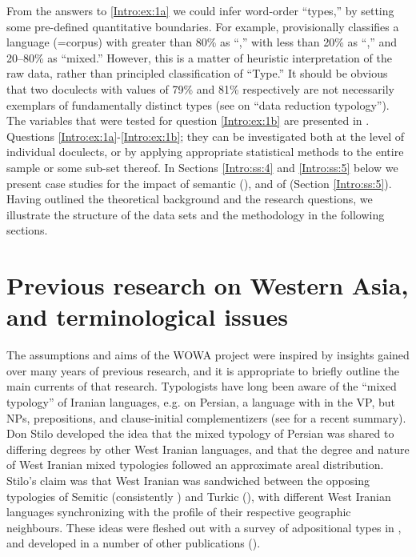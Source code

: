 \documentclass[output=paper,colorlinks,citecolor=brown,collectionchapter]{langscibook}
\begin{document}
From the answers to \ref{Intro:ex:1a} we could infer word-order ``types,'' by setting some pre-defined quantitative boundaries. For example, \citet[559]{levshina_token-based_2019} provisionally classifies a language (=corpus) with greater than 80\%  as ``,'' with less than 20\%  as ``,'' and 20--80\% as ``mixed.'' However, this is a matter of heuristic interpretation of the raw data, rather than principled classification of ``Type.'' It should be obvious that two doculects with values of 79\% and 81\%  respectively are not necessarily exemplars of fundamentally distinct types (see \citealt{walchli_data_2009} on ``data reduction typology''). The variables that were tested for question \ref{Intro:ex:1b} are presented in . Questions \ref{Intro:ex:1a}-\ref{Intro:ex:1b}; they can be investigated both at the level of individual doculects, or by applying appropriate statistical methods to the entire sample or some sub-set thereof. In Sections \ref{Intro:ss:4} and  \ref{Intro:ss:5} below we present case studies for the impact of semantic  (), and of  (Section  \ref{Intro:ss:5}). Having outlined the theoretical background and the research questions, we illustrate the structure of the data sets and the methodology in the following sections.

\section{Previous research on Western Asia, and terminological issues}\label{Intro:ss:2}

\begin{sloppypar}
The assumptions and aims of the WOWA project were inspired by insights gained over many years of previous research, and it is appropriate to briefly outline the main currents of that research. Typologists have long been aware of the ``mixed typology'' of Iranian languages, e.g. \citet[19]{comrie_language_1989} on Persian, a language with  in the VP, but  NPs, prepositions, and clause-initial complementizers (see \citealt{dabir-moghaddam_typological_2018} for a recent summary). Don Stilo developed the idea that the mixed typology of Persian was shared to differing degrees by other West Iranian languages, and that the degree and nature of West Iranian mixed typologies followed an approximate areal distribution. Stilo's claim was that West Iranian was sandwiched between the opposing typologies of Semitic (consistently ) and Turkic (), with different West Iranian languages synchronizing with the profile of their respective geographic neighbours. These ideas were fleshed out with a survey of adpositional types in \citet{Stilo2005IranianBuffer,stilo2006circumpositions,stilo_circumpositions_2009}, and developed in a number of other publications (\citeyear{stilo_intersection_2012,stilo_preverbal_2018,stilo_investigating_2018}).
\end{sloppypar}
\end{document}

